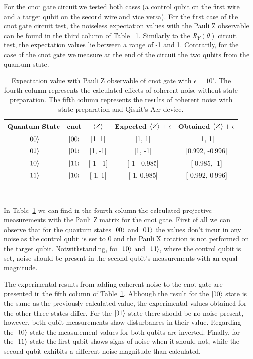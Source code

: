 For the \ac{cnot} gate circuit we tested both cases (a control qubit on the
first wire and a target qubit on the second wire and vice versa). For
the first case of the \ac{cnot}  gate circuit test, the noiseless expectation
values with the Pauli Z observable can be found in the third column of Table
~\ref{tab:cnot_noise}. Similarly to the \(R_{Y}(\theta)\) circuit test,
the expectation values lie between a range of -1 and 1. Contrarily,
for the case of the \ac{cnot}  gate we measure at the end of the circuit the
two qubits from the quantum state. \

\begin{table}[h]
  \centering
  \begin{tabular}{|c|c|c|c|c|}
    \hline
    Quantum State & \ac{cnot} & \(\expval{Z}\) & Expected \(\expval{Z}+\epsilon\) & Obtained \(\expval{Z}+\epsilon\) \\
    \hline
    \(\ket{00}\) & \(\ket{00}\) & [1, 1]   & [1, 1]       & [1, 1]          \\
    \hline
    \(\ket{01}\) & \(\ket{01}\) & [1, -1]  & [1, -1]      & [0.992, -0.996] \\
    \hline
    \(\ket{10}\) & \(\ket{11}\) & [-1, -1] & [-1, -0.985] & [-0.985, -1]    \\
    \hline
    \(\ket{11}\) & \(\ket{10}\) & [-1, 1]  & [-1, 0.985]  & [-0.992, 0.996] \\
    \hline
  \end{tabular}
  \caption{Expectation value with Pauli Z observable of \ac{cnot} gate with \(\epsilon = 10^{\circ}\).
  The fourth column represents the calculated effects of coherent noise without state preparation.
  The fifth column represents the results of coherent noise with state preparation and Qiskit's Aer device.}\label{tab:cnot_noise}
\end{table} \

In Table~\ref{tab:cnot_noise} we can find in the fourth column the calculated
projective measurements with the Pauli Z matrix for the \ac{cnot} gate.
First of all we can observe that for the quantum states \(\ket{00}\)
and \(\ket{01}\) the values don't incur in any noise as the control
qubit is set to 0 and the Pauli X rotation is not performed on the target
qubit. Notwithstanding, for \(\ket{10}\) and \(\ket{11}\), where the
control qubit is set, noise should be present in the second qubit's
measurements with an equal magnitude. \

The experimental results from adding coherent noise to the
\ac{cnot} gate are presented in the fifth column of Table~\ref{tab:cnot_noise}.
Although the result for the \(\ket{00}\) state is the same as the
previously calculated value, the experimental values obtained for
the other three states differ. For the \(\ket{01}\) state there
should be no noise present, however, both qubit measurements
show disturbances in their value. Regarding the \(\ket{10}\) state
the measurement values for both qubits are inverted. Finally,
for the \(\ket{11}\) state the first qubit shows signs of noise
when it should not, while the second qubit exhibits a different noise
magnitude than calculated. \

